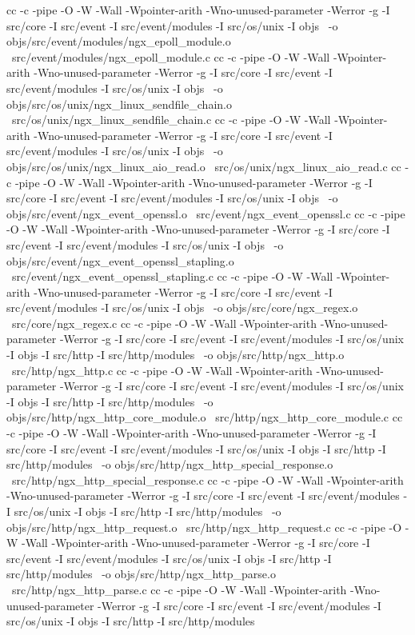 cc -c -pipe  -O -W -Wall -Wpointer-arith -Wno-unused-parameter -Werror -g  -I src/core -I src/event -I src/event/modules -I src/os/unix -I objs \
	-o objs/src/event/modules/ngx_epoll_module.o \
	src/event/modules/ngx_epoll_module.c
cc -c -pipe  -O -W -Wall -Wpointer-arith -Wno-unused-parameter -Werror -g  -I src/core -I src/event -I src/event/modules -I src/os/unix -I objs \
	-o objs/src/os/unix/ngx_linux_sendfile_chain.o \
	src/os/unix/ngx_linux_sendfile_chain.c
cc -c -pipe  -O -W -Wall -Wpointer-arith -Wno-unused-parameter -Werror -g  -I src/core -I src/event -I src/event/modules -I src/os/unix -I objs \
	-o objs/src/os/unix/ngx_linux_aio_read.o \
	src/os/unix/ngx_linux_aio_read.c
cc -c -pipe  -O -W -Wall -Wpointer-arith -Wno-unused-parameter -Werror -g  -I src/core -I src/event -I src/event/modules -I src/os/unix -I objs \
	-o objs/src/event/ngx_event_openssl.o \
	src/event/ngx_event_openssl.c
cc -c -pipe  -O -W -Wall -Wpointer-arith -Wno-unused-parameter -Werror -g  -I src/core -I src/event -I src/event/modules -I src/os/unix -I objs \
	-o objs/src/event/ngx_event_openssl_stapling.o \
	src/event/ngx_event_openssl_stapling.c
cc -c -pipe  -O -W -Wall -Wpointer-arith -Wno-unused-parameter -Werror -g  -I src/core -I src/event -I src/event/modules -I src/os/unix -I objs \
	-o objs/src/core/ngx_regex.o \
	src/core/ngx_regex.c
cc -c -pipe  -O -W -Wall -Wpointer-arith -Wno-unused-parameter -Werror -g  -I src/core -I src/event -I src/event/modules -I src/os/unix -I objs -I src/http -I src/http/modules \
	-o objs/src/http/ngx_http.o \
	src/http/ngx_http.c
cc -c -pipe  -O -W -Wall -Wpointer-arith -Wno-unused-parameter -Werror -g  -I src/core -I src/event -I src/event/modules -I src/os/unix -I objs -I src/http -I src/http/modules \
	-o objs/src/http/ngx_http_core_module.o \
	src/http/ngx_http_core_module.c
cc -c -pipe  -O -W -Wall -Wpointer-arith -Wno-unused-parameter -Werror -g  -I src/core -I src/event -I src/event/modules -I src/os/unix -I objs -I src/http -I src/http/modules \
	-o objs/src/http/ngx_http_special_response.o \
	src/http/ngx_http_special_response.c
cc -c -pipe  -O -W -Wall -Wpointer-arith -Wno-unused-parameter -Werror -g  -I src/core -I src/event -I src/event/modules -I src/os/unix -I objs -I src/http -I src/http/modules \
	-o objs/src/http/ngx_http_request.o \
	src/http/ngx_http_request.c
cc -c -pipe  -O -W -Wall -Wpointer-arith -Wno-unused-parameter -Werror -g  -I src/core -I src/event -I src/event/modules -I src/os/unix -I objs -I src/http -I src/http/modules \
	-o objs/src/http/ngx_http_parse.o \
	src/http/ngx_http_parse.c
cc -c -pipe  -O -W -Wall -Wpointer-arith -Wno-unused-parameter -Werror -g  -I src/core -I src/event -I src/event/modules -I src/os/unix -I objs -I src/http -I src/http/modules \
